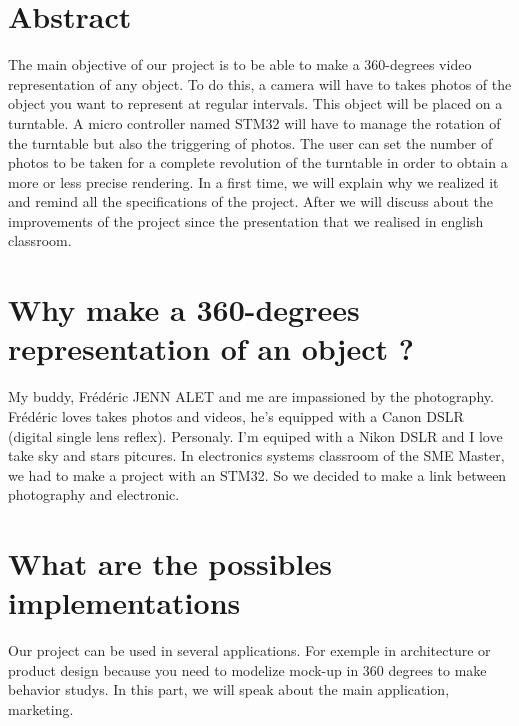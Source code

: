 \section{Abstract}

The main objective of our project is to be able to make a 360-degrees video representation of any object. To do this, a camera will have to takes photos of the object you want to represent at regular intervals. This object will be placed on a turntable. A micro controller named STM32 will have to manage the rotation of the turntable but also the triggering of photos. The user can set the number of photos to be taken for a complete revolution of the turntable in order to obtain a more or less precise rendering. 
\newline
In a first time,  we will explain why we realized it and remind all the specifications of the project. After we will discuss about the improvements of the project since the presentation that we realised in english classroom. 


\section {Why make a 360-degrees representation of an object ?  }

My buddy, Frédéric JENN ALET and me are impassioned by the photography. Frédéric loves takes photos and videos, he's equipped with a Canon DSLR (digital single lens reflex). Personaly. I'm equiped with a Nikon DSLR and I love take sky and stars pitcures. 
In electronics systems classroom of the SME Master, we had to make a project with an STM32. So we decided to make a link between photography and electronic. 

\section{What are the possibles implementations}

Our project can be used in several applications. For exemple in architecture or product design because you need to modelize mock-up in 360 degrees to make behavior studys.
In this part, we will speak about the main application, marketing. 

